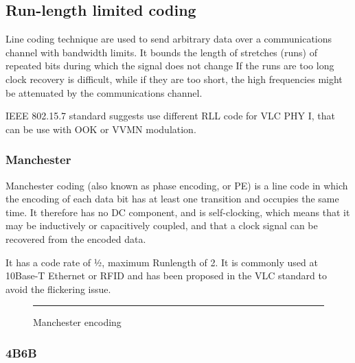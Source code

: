 \subsection{Run-length limited coding} \label{rll}

Line coding technique are used to send arbitrary data over a communications channel with bandwidth
limits.
It bounds the length of stretches (runs) of repeated bits during which the signal does not change
If the runs are too long clock recovery is difficult, while if they are too short, the high frequencies
might be attenuated by the communications channel.

IEEE 802.15.7 standard suggests use different RLL code for VLC PHY I, that can be use with OOK or VVMN modulation.
\subsubsection{Manchester}

Manchester coding (also known as phase encoding, or PE) is a line code in which the encoding of each data bit has at least one transition and occupies the same time. It therefore has no DC component, and is self-clocking, which means that it may be inductively or capacitively coupled, and that a clock signal can be recovered from the encoded data.

It has a code rate of 1⁄2, maximum Runlength of 2.
It is commonly used at 10Base-T Ethernet or RFID and has been proposed in the VLC standard to avoid the flickering issue.

\begin{figure}[htbp]
  \centering
    \rule{35em}{0.5pt}
  \caption[Manchester encoding]{Manchester encoding}
  \label{fig:manchester}
\end{figure}

\subsubsection{4B6B}

